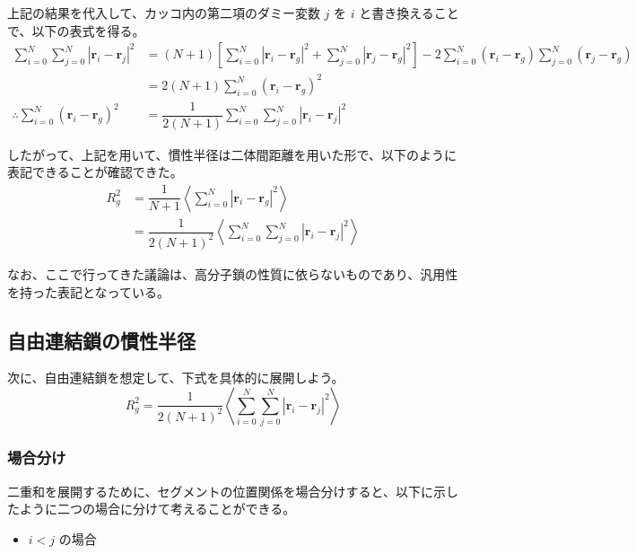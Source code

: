 \documentclass[uplatex,dvipdfmx,a4paper,11pt, titlepage]{jsarticle}
\begin{document}
\begin{appendix}
上記の結果を代入して、カッコ内の第二項のダミー変数 $j$ を $i$ と書き換えることで、以下の表式を得る。
\begin{align*}
\sum_{i = 0}^N \sum_{j=0}^N \left| \bm{r}_i - \bm{r}_j \right|^2
	&= (N + 1) \left[ \sum_{i=0}^N \left| \bm{r}_i - \bm{r}_g \right|^2 + \sum_{j=0}^N \left| \bm{r}_j - \bm{r}_g \right|^2 \right] -2 \sum_{i=0}^N (\bm{r}_i - \bm{r}_g) \sum_{j=0}^N (\bm{r}_j - \bm{r}_g) \\
	&= 2(N + 1) \sum_{i=0}^N (\bm{r}_i- \bm{r}_g)^2 \\
\therefore \sum_{i=0}^N (\bm{r}_i- \bm{r}_g)^2 
	&= \dfrac{1}{2(N+1)} \sum_{i = 0}^N \sum_{j=0}^N \left| \bm{r}_i - \bm{r}_j \right|^2
\end{align*}

したがって、上記を用いて、慣性半径は二体間距離を用いた形で、以下のように表記できることが確認できた。
\begin{align*}
R_g^2 
	&= \dfrac{1}{N+1} \left\langle \sum_{i=0}^{N} |\bm{r}_i - \bm{r}_g|^2 \right\rangle \\
	&= \dfrac{1}{2(N+1)^2} \left \langle \sum_{i=0}^N \sum_{j=0}^N \left| \bm{r}_i - \bm{r}_j \right|^2 \right \rangle
\end{align*}

なお、ここで行ってきた議論は、高分子鎖の性質に依らないものであり、汎用性を持った表記となっている。

\subsection{自由連結鎖の慣性半径}

次に、自由連結鎖を想定して、下式を具体的に展開しよう。
\begin{equation*}
R_g^2 = \dfrac{1}{2(N+1)^2} \left \langle \sum_{i=0}^N \sum_{j=0}^N \left| \bm{r}_i - \bm{r}_j \right|^2 \right \rangle
\end{equation*}

\subsubsection{場合分け}

二重和を展開するために、セグメントの位置関係を場合分けすると、以下に示したように二つの場合に分けて考えることができる。

\begin{itemize}
\item
$i < j$ の場合



\end{itemize}
\end{appendix}
\end{document}
